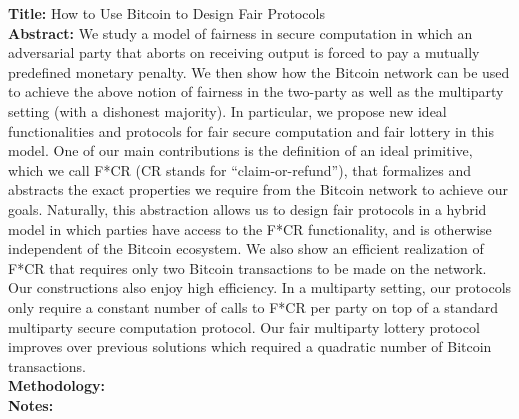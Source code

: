 \documentclass[a4paper, 12pt]{scrartcl}
\begin{document}
\textbf{Title:} How to Use Bitcoin to Design Fair Protocols \parencite{bentov2014} \\
\textbf{Abstract:} We study a model of fairness in secure computation in which an adversarial party that aborts on receiving output is forced to pay a mutually predefined monetary penalty. We then show how the Bitcoin network can be used to achieve the above notion of fairness in the two-party as well as the multiparty setting (with a dishonest majority). In particular, we propose new ideal functionalities and protocols for fair secure computation and fair lottery in this model.
One of our main contributions is the definition of an ideal primitive, which we call F*CR (CR stands for “claim-or-refund”), that formalizes and abstracts the exact properties we require from the Bitcoin network to achieve our goals. Naturally, this abstraction allows us to design fair protocols in a hybrid model in which parties have access to the F*CR functionality, and is otherwise independent of the Bitcoin ecosystem. We also show an efficient realization of 
F*CR that requires only two Bitcoin transactions to be made on the network.
Our constructions also enjoy high efficiency. In a multiparty setting, our protocols only require a constant number of calls to F*CR per party on top of a standard multiparty secure computation protocol. Our fair multiparty lottery protocol improves over previous solutions which required a quadratic number of Bitcoin transactions.\\
\textbf{Methodology:} \\
\textbf{Notes:}


\end{document}
